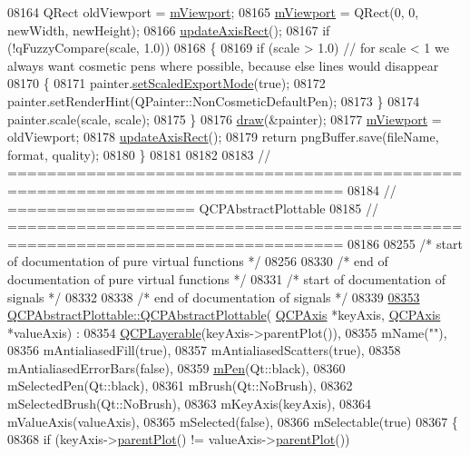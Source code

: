 \begin{DoxyCode}
08164   QRect oldViewport = \hyperlink{a00116_a69feeea9d5254eab8ba7f9be13f85e0b}{mViewport};
08165   \hyperlink{a00116_a69feeea9d5254eab8ba7f9be13f85e0b}{mViewport} = QRect(0, 0, newWidth, newHeight);
08166   \hyperlink{a00116_a428242419d3a1b63f2cbff637986c35c}{updateAxisRect}();
08167   \textcolor{keywordflow}{if} (!qFuzzyCompare(scale, 1.0))
08168   \{
08169     \textcolor{keywordflow}{if} (scale > 1.0) \textcolor{comment}{// for scale < 1 we always want cosmetic pens where possible, because else lines would
       disappear}
08170     \{
08171       painter.\hyperlink{a00047_a256e886e856ae696503aeacae91535cd}{setScaledExportMode}(\textcolor{keyword}{true});
08172       painter.setRenderHint(QPainter::NonCosmeticDefaultPen);
08173     \}
08174     painter.scale(scale, scale);
08175   \}
08176   \hyperlink{a00116_a2e9b3d14dffa43c79835869d488936c9}{draw}(&painter);
08177   \hyperlink{a00116_a69feeea9d5254eab8ba7f9be13f85e0b}{mViewport} = oldViewport;
08178   \hyperlink{a00116_a428242419d3a1b63f2cbff637986c35c}{updateAxisRect}();
08179   \textcolor{keywordflow}{return} pngBuffer.save(fileName, format, quality);
08180 \}
08181 
08182 
08183 \textcolor{comment}{// ================================================================================}
08184 \textcolor{comment}{// =================== QCPAbstractPlottable}
08185 \textcolor{comment}{// ================================================================================}
08186 
08255 \textcolor{comment}{/* start of documentation of pure virtual functions */}
08256 
08330 \textcolor{comment}{/* end of documentation of pure virtual functions */}
08331 \textcolor{comment}{/* start of documentation of signals */}
08332 
08338 \textcolor{comment}{/* end of documentation of signals */}
08339 
\hypertarget{a00115_source_l08353}{}\hyperlink{a00024_af78a036e40db6f53a31abadc5323715a}{08353} \hyperlink{a00024_af78a036e40db6f53a31abadc5323715a}{QCPAbstractPlottable::QCPAbstractPlottable}(
      \hyperlink{a00025}{QCPAxis} *keyAxis, \hyperlink{a00025}{QCPAxis} *valueAxis) :
08354   \hyperlink{a00044}{QCPLayerable}(keyAxis->parentPlot()),
08355   mName(\textcolor{stringliteral}{""}),
08356   mAntialiasedFill(true),
08357   mAntialiasedScatters(true),
08358   mAntialiasedErrorBars(false),
08359   \hyperlink{a00116_abcb7df1a54826856cb8f0e0ef696873b}{mPen}(Qt::black),
08360   mSelectedPen(Qt::black),
08361   mBrush(Qt::NoBrush),
08362   mSelectedBrush(Qt::NoBrush),
08363   mKeyAxis(keyAxis),
08364   mValueAxis(valueAxis),
08365   mSelected(false),
08366   mSelectable(true)
08367 \{
08368   \textcolor{keywordflow}{if} (keyAxis->\hyperlink{a00044_ab7e0e94461566093d36ffc0f5312b109}{parentPlot}() != valueAxis->\hyperlink{a00044_ab7e0e94461566093d36ffc0f5312b109}{parentPlot}())

\end{DoxyCode}
